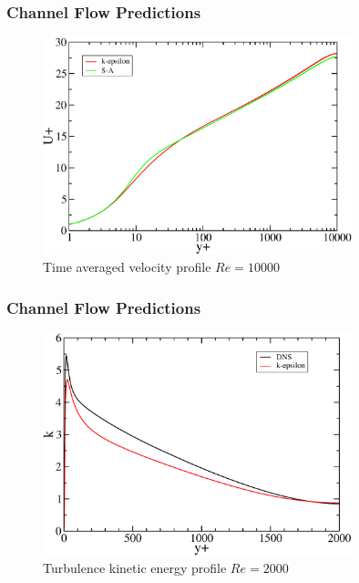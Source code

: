 \documentclass{beamer}
\begin{document}
\begin{frame}\frametitle{Channel Flow Predictions}
\begin{figure}[t]
  \begin{center}
    \includegraphics[width=0.8\textwidth]{Mean10000.pdf}
  \end{center}
  \caption{Time averaged velocity profile $Re=10000$}
\end{figure}
\end{frame}

\begin{frame}\frametitle{Channel Flow Predictions}
\begin{figure}[t]
  \begin{center}
    \includegraphics[width=0.8\textwidth]{k2000.pdf}
  \end{center}
  \caption{Turbulence kinetic energy profile $Re=2000$}
\end{figure}
\end{frame}
\end{document}
